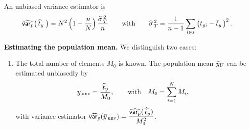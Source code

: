 \documentclass{my_eth_beamer}
\numberwithin{equation}{section}
\begin{document}
\begin{frame}
    \noindent An unbiased \alert{variance estimator} is
    \begin{equation*}
        \widehat{\mathsf{var}_p}\big(\,\widehat{t}_y \;\big) = N^2 \left(1 - \frac{n}{N}\right)
            \frac{\widehat{\sigma}_{\,T}^{\,2}}{n}
            \qquad \text{with} \qquad
        \widehat{\sigma}_{\,T}^{\,2} = \frac{1}{n - 1} \sum_{i \in s}
            \left(t_{yi} - \bar{t}_y \, \right)^2.
    \end{equation*}

    \vspace{1.5em}

    \textbf{\textcolor{fhnwblue}{Estimating the population mean.}} We
    distinguish \alert{two cases}:

    \vspace{0.25em}

    \begin{enumerate}[1)]
    \setlength{\itemsep}{8pt}
        \item The total number of elements $M_0$ is \alert{known}. The
            population mean $\bar{y}_U$ can be estimated unbiasedly by
            \begin{equation*}
                \bar{y}_{\mathrm{\,unv}} = \frac{\widehat{t}_y}{M_0}, \qquad
                \text{with} \quad M_0 = \sum_{i = 1}^N M_i,
            \end{equation*}
            with \alert{variance estimator} \;
            $\widehat{\mathsf{var}_p}(\bar{y}_{\,\mathrm{unv}}) =
                \displaystyle{\frac{\widehat{\ensuremath{\mathsf{var}_p}}(\,\ensuremath{\widehat{t}}_y)}{M_0^2}}$.
    \end{enumerate}
\end{frame}
\end{document}
